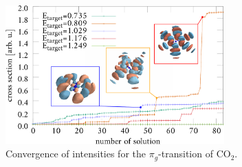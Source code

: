 \begin{figure}
\includegraphics[width=0.75\textwidth]{Figures/CO2/Cronverge}
\caption{Convergence of intensities for the $\pi_g$-transition of CO$_2$.}
\label{cronverge}
\end{figure}

